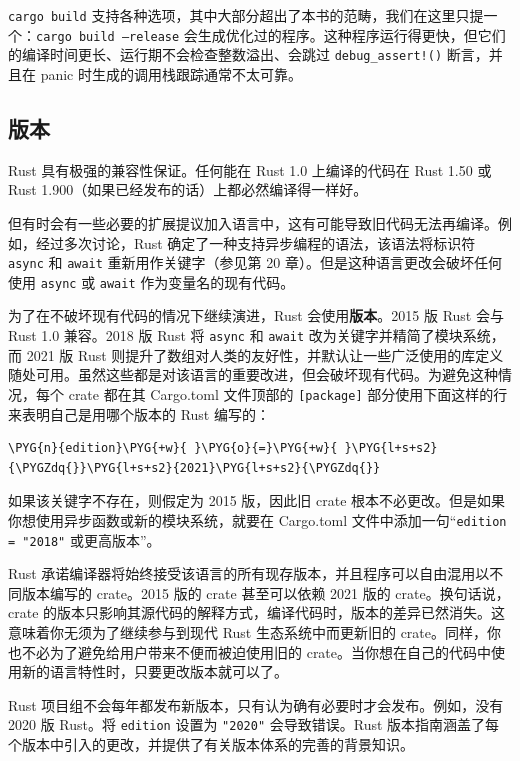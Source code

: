 \texttt{cargo build} 支持各种选项，其中大部分超出了本书的范畴，我们在这里只提一个：\texttt{cargo build --release} 会生成优化过的程序。这种程序运行得更快，但它们的编译时间更长、运行期不会检查整数溢出、会跳过 \texttt{debug\_assert!()} 断言，并且在 panic 时生成的调用栈跟踪通常不太可靠。

\subsection{版本}

Rust 具有极强的兼容性保证。任何能在 Rust 1.0 上编译的代码在 Rust 1.50 或 Rust 1.900（如果已经发布的话）上都必然编译得一样好。

但有时会有一些必要的扩展提议加入语言中，这有可能导致旧代码无法再编译。例如，经过多次讨论，Rust 确定了一种支持异步编程的语法，该语法将标识符 \texttt{async} 和 \texttt{await} 重新用作关键字（参见第 20 章）。但是这种语言更改会破坏任何使用 \texttt{async} 或 \texttt{await} 作为变量名的现有代码。

为了在不破坏现有代码的情况下继续演进，Rust 会使用\textbf{版本}。2015 版 Rust 会与 Rust 1.0 兼容。2018 版 Rust 将 \texttt{async} 和 \texttt{await} 改为关键字并精简了模块系统，而 2021 版 Rust 则提升了数组对人类的友好性，并默认让一些广泛使用的库定义随处可用。虽然这些都是对该语言的重要改进，但会破坏现有代码。为避免这种情况，每个 crate 都在其 Cargo.toml 文件顶部的 \texttt{[package]} 部分使用下面这样的行来表明自己是用哪个版本的 Rust 编写的：

\begin{Verbatim}[commandchars=\\\{\},breaklines=true,breakanywhere=true,fontsize=\codefont,xleftmargin=17bp]
\PYG{n}{edition}\PYG{+w}{ }\PYG{o}{=}\PYG{+w}{ }\PYG{l+s+s2}{\PYGZdq{}}\PYG{l+s+s2}{2021}\PYG{l+s+s2}{\PYGZdq{}}
\end{Verbatim}

如果该关键字不存在，则假定为 2015 版，因此旧 crate 根本不必更改。但是如果你想使用异步函数或新的模块系统，就要在 Cargo.toml 文件中添加一句“\texttt{edition = "2018"} 或更高版本”。

Rust 承诺编译器将始终接受该语言的所有现存版本，并且程序可以自由混用以不同版本编写的 crate。2015 版的 crate 甚至可以依赖 2021 版的 crate。换句话说，crate 的版本只影响其源代码的解释方式，编译代码时，版本的差异已然消失。这意味着你无须为了继续参与到现代 Rust 生态系统中而更新旧的 crate。同样，你也不必为了避免给用户带来不便而被迫使用旧的 crate。当你想在自己的代码中使用新的语言特性时，只要更改版本就可以了。

Rust 项目组不会每年都发布新版本，只有认为确有必要时才会发布。例如，没有 2020 版 Rust。将 \texttt{edition} 设置为 \texttt{"2020"} 会导致错误。Rust 版本指南涵盖了每个版本中引入的更改，并提供了有关版本体系的完善的背景知识。

